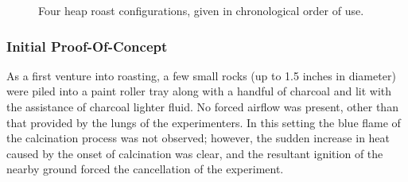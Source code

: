 \begin{figure}[htb]
\caption{Four heap roast configurations, given in chronological order of use.}
\label{fig:heaproast}
\end{figure}

\subsubsection{Initial Proof-Of-Concept}

As a first venture into roasting, a few small rocks (up to 1.5 inches in
diameter) were piled into a paint roller tray along with a handful of charcoal
and lit with the assistance of charcoal lighter fluid.  No forced airflow was
present, other than that provided by the lungs of the experimenters.  In this
setting the blue flame of the calcination process was not observed; however, the
sudden increase in heat caused by the onset of calcination was clear, and the
resultant ignition of the nearby ground forced the cancellation of the
experiment.
